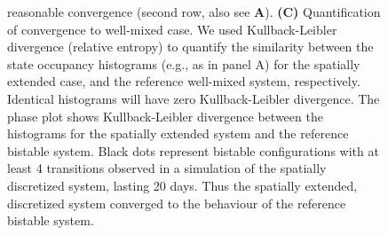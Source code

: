 \documentclass[9pt,lineno,doublespacing]{elife}
\begin{document}
\begin{figure}[ht!]
{        reasonable convergence (second row, also see \textbf{A}).
        \textbf{(C)} Quantification of convergence to well-mixed case. We used
        Kullback-Leibler divergence (relative entropy) to quantify the
        similarity between the state occupancy histograms (e.g., as in panel A)
        for the spatially extended case, and the reference well-mixed system,
        respectively. Identical histograms will have zero Kullback-Leibler
        divergence. The phase plot shows Kullback-Leibler divergence between the
        histograms for the spatially extended system and the reference bistable
        system. Black dots represent bistable configurations with at least 4
        transitions observed in a simulation of the spatially discretized
        system, lasting 20 days.  Thus the spatially extended, discretized
        system converged to the behaviour of the reference bistable system.
    }\label{fig:method_validation} 


\end{figure}
\end{document}
